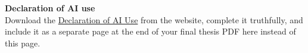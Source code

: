 \cleardoublepage
{}
\thispagestyle{empty}
\textbf{Declaration of AI use}\\

Download the \href{https://www.ot.mgt.tum.de/fileadmin/w00cjr/log/Theses_ProjectStudies/Logscm_AI_Declaration.pdf}{Declaration of AI Use} from the website, complete it truthfully, and include it as a separate page at the end of your final thesis PDF here instead of this page.

